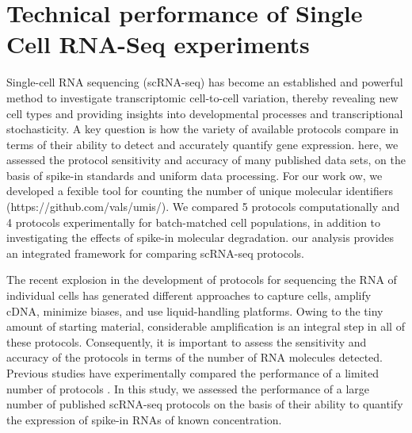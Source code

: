 
\chapter{Technical performance of Single Cell RNA-Seq experiments}

\graphicspath{{Chapter2/Figs/}}

Single-cell RNA sequencing (scRNA-seq) has become an established and powerful method to investigate transcriptomic cell-to-cell variation, thereby revealing new cell types
and providing insights into developmental processes and transcriptional stochasticity. A key question is how the variety of available protocols compare in terms of their ability to detect and accurately quantify gene expression. here, we assessed the protocol sensitivity and accuracy of many published data sets, on the basis of spike-in standards and uniform data processing. For our work ow, we developed a fexible tool for counting the number of unique molecular identifiers (https://github.com/vals/umis/). We compared  5 protocols computationally and 4 protocols experimentally for batch-matched cell populations, in addition to investigating the effects of spike-in molecular degradation. our analysis provides an integrated framework for comparing scRNA-seq protocols.

The recent explosion in the development of protocols for sequencing the RNA of individual cells  \cite{Macaulay2014-iq, Stegle2015-qy} has generated different approaches to capture cells, amplify cDNA, minimize biases, and use liquid-handling platforms. Owing to the tiny amount of starting material, considerable amplification is an integral step in all of these protocols. Consequently, it is important to assess the sensitivity and accuracy of the protocols in terms of the number of RNA molecules detected. Previous studies have experimentally compared the performance of a limited number of protocols  \cite{Wu2014-ot, Ziegenhain2016-wc}. In this study, we assessed the performance of a large number of published scRNA-seq protocols on the basis of their ability to quantify the expression of spike-in RNAs of known concentration.


